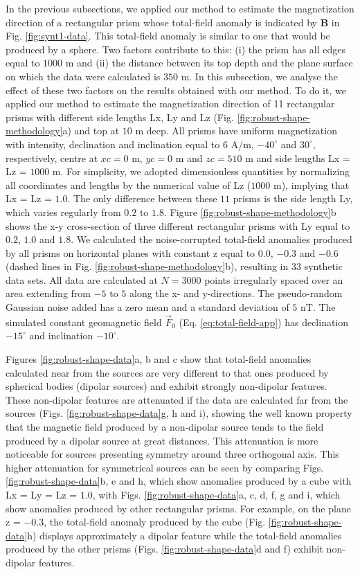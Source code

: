 \documentclass[journal abbreviation, npg]{copernicus}
\begin{document}
In the previous subsections, we applied our method to estimate the magnetization direction of a rectangular prism whose total-field anomaly is indicated by $\textbf{B}$ in Fig. \ref{fig:synt1-data}. This total-field anomaly is similar to one that would be produced by a sphere. Two factors contribute to this: (i) the prism has all edges equal to $1000$ m and (ii) the distance between its top depth and the plane surface on which the data were calculated is $350$ m. In this subsection, we analyse the effect of these two factors on the results obtained with our method. To do it, we applied our method to estimate the magnetization direction of 11 rectangular prisms with different side lengths Lx, Ly and Lz (Fig. \ref{fig:robust-shape-methodology}a) and top at $10$ m deep. All prisms have uniform magnetization with intensity, declination and inclination equal to $6$ A/m, $-40^{\circ}$ and $30^{\circ}$, respectively, centre at $xc = 0$ m, $yc = 0$ m and $zc = 510$ m and side lengths Lx = Lz = $1000$ m. For simplicity, we adopted dimensionless quantities by normalizing all coordinates and lengths by the numerical value of Lz ($1000$ m), implying that Lx = Lz = $1.0$. The only difference between these $11$ prisms is the side length Ly, which varies regularly from $0.2$ to $1.8$. Figure \ref{fig:robust-shape-methodology}b shows the x-y cross-section of three different rectangular prisms with Ly equal to $0.2$, $1.0$ and $1.8$. We calculated the noise-corrupted total-field anomalies produced by all prisms on horizontal planes with constant z equal to $0.0$, $-0.3$ and $-0.6$ (dashed lines in Fig. \ref{fig:robust-shape-methodology}b), resulting in $33$ synthetic data sets. All data are calculated at $N = 3000$ points irregularly spaced over an area extending from $-5$ to $5$ along the x- and y-directions. The pseudo-random Gaussian noise added has a zero mean and a standard deviation of $5$ nT. The simulated constant geomagnetic field $\vec{F}_{0}$ (Eq. \ref{eq:total-field-app}) has declination $-15^{\circ}$ and inclination $-10^{\circ}$.

Figures \ref{fig:robust-shape-data}a, b and c show that total-field anomalies calculated near from the sources are very different to that ones produced by spherical bodies (dipolar sources) and exhibit strongly non-dipolar features. These non-dipolar features are attenuated if the data are calculated far from the sources (Figs. \ref{fig:robust-shape-data}g, h and i), showing the well known property that the magnetic field produced by a non-dipolar source tends to the field produced by a dipolar source at great distances. This attenuation is more noticeable for sources presenting symmetry around three orthogonal axis. This higher attenuation for symmetrical sources can be seen by comparing Figs. \ref{fig:robust-shape-data}b, e and h, which show anomalies produced by a cube with Lx = Ly = Lz = $1.0$, with Figs. \ref{fig:robust-shape-data}a, c, d, f, g and i, which show anomalies produced by other rectangular prisms. For example, on the plane z = $-0.3$, the total-field anomaly produced by the cube (Fig. \ref{fig:robust-shape-data}h) displays  approximately a dipolar feature while the total-field anomalies produced by the other prisms (Figs. \ref{fig:robust-shape-data}d and f) exhibit non-dipolar features.
\end{document}
